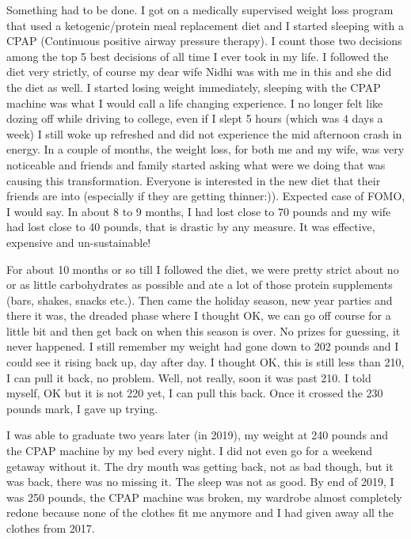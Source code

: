 \documentclass[
  oneside]{book}
\begin{document}
Something had to be done. I got on a medically supervised weight loss program that used a ketogenic/protein meal replacement diet and I started sleeping with a CPAP (Continuous positive airway pressure therapy). I count those two decisions among the top 5 best decisions of all time I ever took in my life. I followed the diet very strictly, of course my dear wife Nidhi was with me in this and she did the diet as well. I started losing weight immediately, sleeping with the CPAP machine was what I would call a life changing experience. I no longer felt like dozing off while driving to college, even if I slept 5 hours (which was 4 days a week) I still woke up refreshed and did not experience the mid afternoon crash in energy. In a couple of months, the weight loss, for both me and my wife, was very noticeable and friends and family started asking what were we doing that was causing this transformation. Everyone is interested in the new diet that their friends are into (especially if they are getting thinner:)). Expected case of FOMO, I would say. In about 8 to 9 months, I had lost close to 70 pounds and my wife had lost close to 40 pounds, that is drastic by any measure. It was effective, expensive and un-sustainable!

For about 10 months or so till I followed the diet, we were pretty strict about no or as little carbohydrates as possible and ate a lot of those protein supplements (bars, shakes, snacks etc.). Then came the holiday season, new year parties and there it was, the dreaded phase where I thought OK, we can go off course for a little bit and then get back on when this season is over. No prizes for guessing, it never happened. I still remember my weight had gone down to 202 pounds and I could see it rising back up, day after day. I thought OK, this is still less than 210, I can pull it back, no problem. Well, not really, soon it was past 210. I told myself, OK but it is not 220 yet, I can pull this back. Once it crossed the 230 pounds mark, I gave up trying.

I was able to graduate two years later (in 2019), my weight at 240 pounds and the CPAP machine by my bed every night. I did not even go for a weekend getaway without it. The dry mouth was getting back, not as bad though, but it was back, there was no missing it. The sleep was not as good. By end of 2019, I was 250 pounds, the CPAP machine was broken, my wardrobe almost completely redone because none of the clothes fit me anymore and I had given away all the clothes from 2017.
\end{document}

